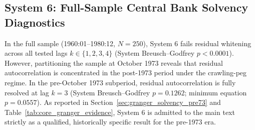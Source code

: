 \subsection{System 6: Full-Sample Central Bank Solvency Diagnostics}
In the full sample (1960:01--1980:12, $N=250$), System 6 fails residual whitening across all tested lags $k \in \{1, 2, 3, 4\}$ (System Breusch--Godfrey $p < 0.0001$). However, partitioning the sample at October 1973 reveals that residual autocorrelation is concentrated in the post-1973 period under the crawling-peg regime. In the pre-October 1973 subperiod, residual autocorrelation is fully resolved at lag $k=3$ (System Breusch--Godfrey $p = 0.1262$; minimum equation $p = 0.0557$). As reported in Section~\ref{sec:granger_solvency_pre73} and Table~\ref{tab:core_granger_evidence}, System 6 is admitted to the main text strictly as a qualified, historically specific result for the pre-1973 era.
